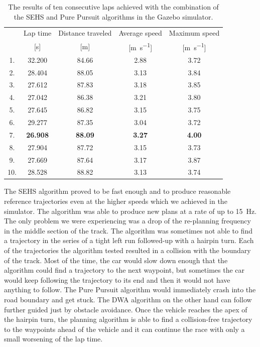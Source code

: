 \begin{table}
	\centering
	\label{tbl:pure-pursuit}
	\begin{tabular}{c c c c c}
		\toprule
		& Lap time       & Distance traveled  & Average speed             & Maximum speed             \\
		& [\si{\second}] & [\si{\meter}]      & [\si{\meter\per\second}]  & [\si{\meter\per\second}]  \\
		\midrule
		1.  & 32.200 & 84.66 & 2.88 & 3.72 \\
		2.  & 28.404 & 88.05 & 3.13 & 3.84 \\
		3.  & 27.612 & 87.83 & 3.18 & 3.85 \\
		4.  & 27.042 & 86.38 & 3.21 & 3.80 \\
		5.  & 27.645 & 86.82 & 3.15 & 3.75 \\
		6.  & 29.277 & 87.35 & 3.04 & 3.72 \\
		7.  & \textbf{26.908} & \textbf{88.09} & \textbf{3.27} & \textbf{4.00} \\
		8.  & 27.904 & 87.72 & 3.15 & 3.73 \\
		9.  & 27.669 & 87.64 & 3.17 & 3.87 \\
		10. & 28.528 & 88.82 & 3.13 & 3.74 \\

		\bottomrule
	\end{tabular}
	\caption{The results of ten consecutive laps achieved with the combination of the SEHS and Pure Pursuit algorithms in the Gazebo simulator.}
\end{table}

The \gls{SEHS} algorithm proved to be fast enough and to produce reasonable reference trajectories even at the higher speeds which we achieved in the simulator. The algorithm was able to produce new plans at a rate of up to \SI{15}{\hertz}. The only problem we were experiencing was a drop of the re-planning frequency in the middle section of the track. The algorithm was sometimes not able to find a trajectory in the series of a tight left run followed-up with a hairpin turn. Each of the trajectories the algorithm tested resulted in a collision with the boundary of the track. Most of the time, the car would slow down enough that the algorithm could find a trajectory to the next waypoint, but sometimes the car would keep following the trajectory to its end and then it would not have anything to follow. The Pure Pursuit algorithm would immediately crash into the road boundary and get stuck. The \gls*{DWA} algorithm on the other hand can follow further guided just by obstacle avoidance. Once the vehicle reaches the apex of the hairpin turn, the planning algorithm is able to find a collision-free trajectory to the waypoints ahead of the vehicle and it can continue the race with only a small worsening of the lap time.

